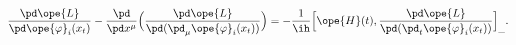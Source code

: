 \begin{equation}	\label{12.78}
\frac{\pd\ope{L}}{\pd \ope{\varphi}_i(x_t)}
-
\frac{\pd}{\pd x^\mu}\Bigl(
		\frac{\pd\ope{L}}{\pd(\pd_\mu\ope{\varphi}_i(x_t) )}
		 \Bigr)
=
- \frac{1}{\ih}
\Bigl[
\ope{H}(t) ,
\frac{\pd\ope{L}}{\pd(\pd_t\ope{\varphi}_i(x_t) )}
\Bigr]_{\_} .
	\end{equation}


